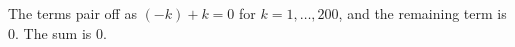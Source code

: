 The terms pair off as $(-k)+k=0$ for $k=1,\dots,200$, and the remaining term is $0$. The sum is $\boxed{0}$.

